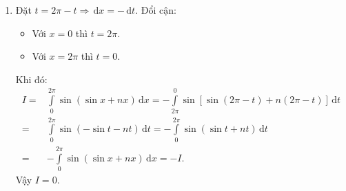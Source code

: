 \begin{bt}
{\begin{enumerate}
				\begin{itemize}
					\item Với $x=0$ thì $t=1$.
					\item Với $x=\dfrac{\pi}{2}$ thì $t=2$.
				\end{itemize}
				Khi đó:
				$$\displaystyle\int\limits_{0}^{\frac{\pi}{2}}(1+\sin^2 x)^3\cdot \sin 2x\mathrm{\,d}x=\displaystyle\int\limits_1^2t^3\mathrm{\,d}t=\dfrac{15}{4}.$$
				\item Đặt $t=2\pi-t \Rightarrow \mathrm{\,d}x=-\mathrm{\,d}t.$ Đổi cận:
				\begin{itemize}
					\item Với $x=0$ thì $t=2\pi$.
					\item Với $x=2\pi$ thì $t=0$.
				\end{itemize}
				Khi đó:
				\begin{equation*}
				\begin{split}
				I=&\displaystyle\int\limits_0^{2\pi}\sin (\sin x+nx)\mathrm{\,d}x=-\displaystyle\int\limits_{2\pi}^0\sin \left[\sin (2\pi-t)+n(2\pi-t)\right]\mathrm{\,d}t\\
				=&\displaystyle\int\limits_0^{2\pi}\sin (-\sin t-nt)\mathrm{\,d}t=-\displaystyle\int\limits_0^{2\pi}\sin (\sin t+nt)\mathrm{\,d}t\\
				=&-\displaystyle\int\limits_0^{2\pi}\sin (\sin x+nx)\mathrm{\,d}x=-I.
				\end{split}
				\end{equation*}
				Vậy $I=0$.
			\end{enumerate}
		}
	\end{bt}
	
